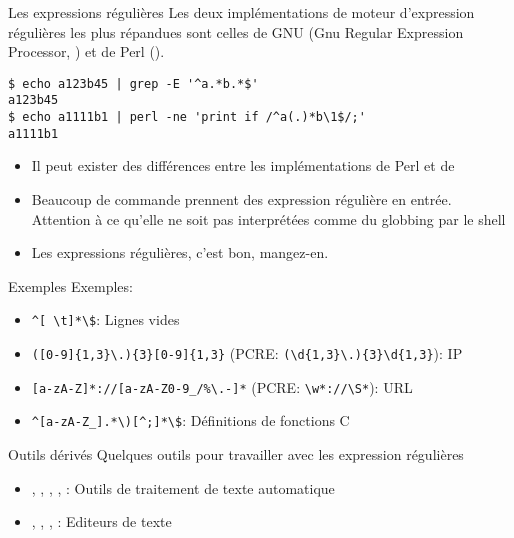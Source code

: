\begin{frame}[fragile=singleslide]{Les expressions régulières}
  Les deux implémentations de  moteur d'expression régulières les plus
  répandues  sont celles  de  GNU (Gnu  Regular Expression  Processor,
  ) et de Perl ().
  \begin{lstlisting}
$ echo a123b45 | grep -E '^a.*b.*$'
a123b45
$ echo a1111b1 | perl -ne 'print if /^a(.)*b\1$/;'
a1111b1
  \end{lstlisting}
  \begin{itemize}
  \item Il  peut exister des différences entre  les implémentations de
    Perl et de 
  \item  Beaucoup de  commande  prennent des  expression régulière  en
    entrée. Attention à  ce qu'elle ne soit pas  interprétées comme du
    globbing par le shell
  \item Les expressions régulières, c'est bon, mangez-en.
  \end{itemize}
\end{frame}

\begin{frame}[fragile=singleslide]{Exemples}
  Exemples:
  \begin{itemize} 
  \item \verb+^[ \t]*\$+: Lignes vides
  \item            \verb+([0-9]{1,3}\.){3}[0-9]{1,3}+           (PCRE:
    \verb+(\d{1,3}\.){3}\d{1,3}+): IP
  \item          \verb+[a-zA-Z]*://[a-zA-Z0-9_/%\.-]*+          (PCRE:
    \verb+\w*://\S*+): URL
  \item \verb+^[a-zA-Z_].*\)[^;]*\$+: Définitions de fonctions C
  \end{itemize} 
\end{frame} 

\begin{frame}[fragile=singleslide]{Outils dérivés}
  Quelques outils pour travailler avec les expression régulières
  \begin{itemize}
  \item  {}, ,  , ,  :
    Outils de traitement de texte automatique
  \item {}, , , : Editeurs de texte
  \end{itemize}
\end{frame}

